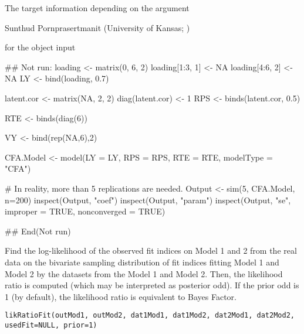 \documentclass[a4paper]{book}
\begin{document}
%
\begin{Value}
The target information depending on the  argument
\end{Value}
%
\begin{Author}\relax
Sunthud Pornprasertmanit (University of Kansas; )
\end{Author}
%
\begin{SeeAlso}\relax
{} for the object input
\end{SeeAlso}
%
\begin{Examples}
\begin{ExampleCode}
## Not run: 
loading <- matrix(0, 6, 2)
loading[1:3, 1] <- NA
loading[4:6, 2] <- NA
LY <- bind(loading, 0.7)

latent.cor <- matrix(NA, 2, 2)
diag(latent.cor) <- 1
RPS <- binds(latent.cor, 0.5)

RTE <- binds(diag(6))

VY <- bind(rep(NA,6),2)

CFA.Model <- model(LY = LY, RPS = RPS, RTE = RTE, modelType = "CFA")

# In reality, more than 5 replications are needed.
Output <- sim(5, CFA.Model, n=200)
inspect(Output, "coef")
inspect(Output, "param")
inspect(Output, "se", improper = TRUE, nonconverged = TRUE)

## End(Not run)
\end{ExampleCode}
\end{Examples}
%
\begin{Description}\relax
Find the log-likelihood of the observed fit indices on Model 1 and 2 from the real data on the bivariate sampling distribution of fit indices fitting Model 1 and Model 2 by the datasets from the Model 1 and Model 2. Then, the likelihood ratio is computed (which may be interpreted as posterior odd). If the prior odd is 1 (by default), the likelihood ratio is equivalent to Bayes Factor.
\end{Description}
%
\begin{Usage}
\begin{verbatim}
likRatioFit(outMod1, outMod2, dat1Mod1, dat1Mod2, dat2Mod1, dat2Mod2, 
usedFit=NULL, prior=1)
\end{verbatim}
\end{Usage}
%
\end{document}
